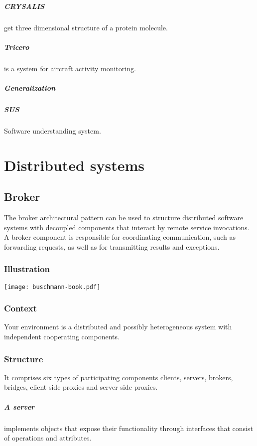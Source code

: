 \documentclass[a4paper,11pt,twocolumn]{report}
\begin{document}
    \paragraph{CRYSALIS} get three dimensional structure of a protein molecule.
    \paragraph{Tricero} is a system for aircraft activity monitoring.
    \paragraph{Generalization}
    \paragraph{SUS} Software understanding system.


    \chapter{Distributed systems}
    
    \section{Broker}
    The broker architectural pattern can be used to structure distributed
    software systems with decoupled components that interact by remote service
    invocations. A broker component is responsible for coordinating
    communication, such as forwarding requests, as well as for transmitting
    results and exceptions.
    \subsection{Illustration}
    \texttt{[image: buschmann-book.pdf]}
    \subsection{Context}
    Your environment is a distributed and possibly heterogeneous system with
    independent cooperating components.
    \subsection{Structure}
    It comprises six types of participating components clients, servers,
    brokers, bridges, client side proxies and server side proxies.
    \paragraph{A server} implements objects that expose their functionality
    through interfaces that consist of operations and attributes.
\end{document}
